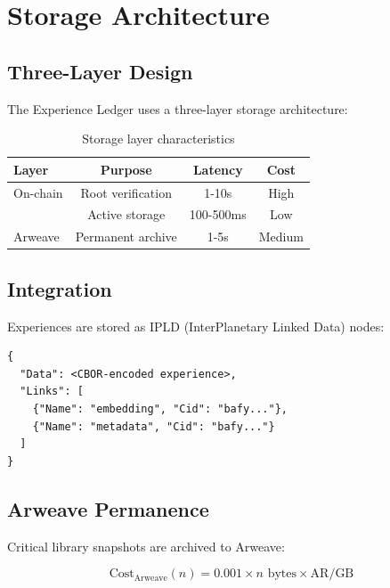 \section{Storage Architecture}

\label{sec:storage}

\subsection{Three-Layer Design}

The Experience Ledger uses a three-layer storage architecture:

\begin{table}[t]
\centering
\begin{tabular}{lccc}
\toprule
\textbf{Layer} & \textbf{Purpose} & \textbf{Latency} & \textbf{Cost} \\
\midrule
On-chain & Root verification & 1-10s & High \\
\IPFS{} & Active storage & 100-500ms & Low \\
Arweave & Permanent archive & 1-5s & Medium \\
\bottomrule
\end{tabular}
\caption{Storage layer characteristics}
\label{tab:storage}
\end{table}

\subsection{\IPFS{} Integration}

Experiences are stored as IPLD (InterPlanetary Linked Data) nodes:

\begin{lstlisting}[caption=IPLD Experience Node]
{
  "Data": <CBOR-encoded experience>,
  "Links": [
    {"Name": "embedding", "Cid": "bafy..."},
    {"Name": "metadata", "Cid": "bafy..."}
  ]
}
\end{lstlisting}

\subsection{Arweave Permanence}

Critical library snapshots are archived to Arweave:

\begin{equation}
\text{Cost}_{\text{Arweave}}(n) = 0.001 \times n \text{ bytes} \times \text{AR/GB}
\end{equation}

